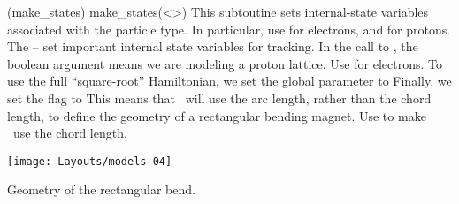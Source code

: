 %
\glossary[ptccmds](make_states)%
  {make_states(<\textit{}>)}%
  {This subtoutine sets internal-state variables associated
   with the particle type.
   In particular, use  for electrons,
   and  for protons.}
%
The -- set important
internal state variables for tracking. In the call to
, the boolean argument  means we are
modeling a proton lattice. Use  for electrons.%
To use the full ``square-root'' Hamiltonian, we set the global
parameter  to  
%
Finally, we set the flag  to  This
means that \PTC\ will use the arc length, rather than the chord
length, to define the geometry of a rectangular bending magnet.
Use  to make \PTC\ use the chord length. 

\begin{marginfigure}\forcerectofloat
  \texttt{[image: Layouts/models-04]}
  \caption{Geometry of the rectangular bend.}
  \label{fig:rect.bend}
\end{marginfigure}


